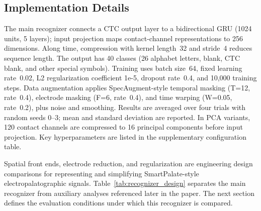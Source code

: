 \subsection{Implementation Details}

The main recognizer connects a CTC output layer to a bidirectional GRU (1024 units, 5 layers); input projection maps contact-channel representations to 256 dimensions.
Along time, compression with kernel length~32 and stride~4 reduces sequence length.
The output has 40 classes (26 alphabet letters, blank, CTC blank, and other special symbols).
Training uses batch size~64, fixed learning rate~0.02, L2 regularization coefficient 1e-5, dropout rate~0.4, and 10{,}000 training steps.
Data augmentation applies SpecAugment-style temporal masking (T=12, rate~0.4), electrode masking (F=6, rate~0.4), and time warping (W=0.05, rate~0.2), plus noise and smoothing.
Results are averaged over four trials with random seeds 0--3; mean and standard deviation are reported.
In PCA variants, 120 contact channels are compressed to 16 principal components before input projection.
Key hyperparameters are listed in the supplementary configuration table.

Spatial front ends, electrode reduction, and regularization are engineering design comparisons for representing and simplifying SmartPalate-style electropalatographic signals.
Table~\ref{tab:recognizer_design} separates the main recognizer from auxiliary analyses referenced later in the paper.
The next section defines the evaluation conditions under which this recognizer is compared.
